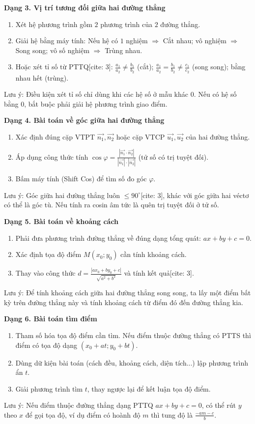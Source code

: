 \textbf{Dạng 3. Vị trí tương đối giữa hai đường thẳng}
\begin{enumerate}
\item Xét hệ phương trình gồm $2$ phương trình của $2$ đường thẳng.
\item Giải hệ bằng máy tính: Nếu hệ có $1$ nghiệm $\Rightarrow$ Cắt nhau; vô nghiệm $\Rightarrow$ Song song; vô số nghiệm $\Rightarrow$ Trùng nhau.
\item Hoặc xét tỉ số từ PTTQ[cite: 3]: $\frac{a_1}{a_2} \neq \frac{b_1}{b_2}$ (cắt); $\frac{a_1}{a_2} = \frac{b_1}{b_2} \neq \frac{c_1}{c_2}$ (song song); bằng nhau hết (trùng).
\end{enumerate}
Lưu ý: Điều kiện xét tỉ số chỉ dùng khi các hệ số ở mẫu khác $0$. Nếu có hệ số bằng $0$, bắt buộc phải giải hệ phương trình giao điểm.

\textbf{Dạng 4. Bài toán về góc giữa hai đường thẳng}
\begin{enumerate}
\item Xác định đúng cặp VTPT $\overrightarrow{n_1}, \overrightarrow{n_2}$ hoặc cặp VTCP $\overrightarrow{u_1}, \overrightarrow{u_2}$ của hai đường thẳng.
\item Áp dụng công thức tính $\cos \varphi = \frac{|\overrightarrow{n_1} \cdot \overrightarrow{n_2}|}{|\overrightarrow{n_1}| \cdot |\overrightarrow{n_2}|}$ (tử số có trị tuyệt đối).
\item Bấm máy tính (Shift Cos) để tìm số đo góc $\varphi$.
\end{enumerate}
Lưu ý: Góc giữa hai đường thẳng luôn $\le 90^\circ$[cite: 3], khác với góc giữa hai véctơ có thể là góc tù. Nếu tính ra cosin âm tức là quên trị tuyệt đối ở tử số.

\textbf{Dạng 5. Bài toán về khoảng cách}
\begin{enumerate}
\item Phải đưa phương trình đường thẳng về đúng dạng tổng quát: $ax+by+c=0$.
\item Xác định tọa độ điểm $M(x_0; y_0)$ cần tính khoảng cách.
\item Thay vào công thức $d = \frac{|ax_0+by_0+c|}{\sqrt{a^2+b^2}}$ và tính kết quả[cite: 3].
\end{enumerate}
Lưu ý: Để tính khoảng cách giữa hai đường thẳng song song, ta lấy một điểm bất kỳ trên đường thẳng này và tính khoảng cách từ điểm đó đến đường thẳng kia.

\textbf{Dạng 6. Bài toán tìm điểm}
\begin{enumerate}
\item Tham số hóa tọa độ điểm cần tìm. Nếu điểm thuộc đường thẳng có PTTS thì điểm có tọa độ dạng $(x_0+at; y_0+bt)$.
\item Dùng dữ kiện bài toán (cách đều, khoảng cách, diện tích...) lập phương trình ẩn $t$.
\item Giải phương trình tìm $t$, thay ngược lại để kết luận tọa độ điểm.
\end{enumerate}
Lưu ý: Nếu điểm thuộc đường thẳng dạng PTTQ $ax+by+c=0$, có thể rút $y$ theo $x$ để gọi tọa độ, ví dụ điểm có hoành độ $m$ thì tung độ là $\frac{-am-c}{b}$.

